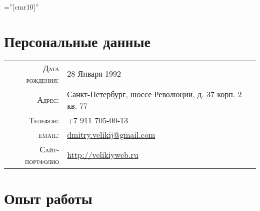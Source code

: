 \documentclass[a4paper,10pt]{article} %
\begin{document}
\pagestyle{empty} %

\font\fb=''[cmr10]'' %


\par{\bigskip\par} %

\section{Персональные данные}

\begin{tabular}{rl}
    \textsc{Дата рождения:} & 28 Января 1992 \\
    \textsc{Адрес:} &  Санкт-Петербург, шоссе Революции, д. 37 корп. 2 кв. 77 \\
    \textsc{Телефон:} & +7 911 705-00-13\\
    \textsc{email:} &
    \href{mailto:dmitry.velikij@gmail.com}{dmitry.velikij@gmail.com}\\
    \textsc{Сайт-портфолио} &
    \href{http://velikiyweb.ru}{http://velikiyweb.ru}
\end{tabular}


\section{Опыт работы}

\end{document}
